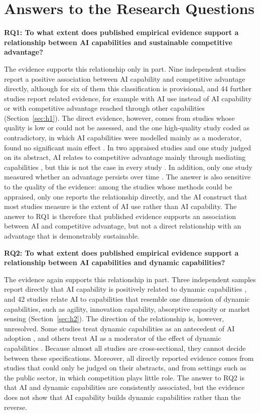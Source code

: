 \section{Answers to the Research Questions}
\label{sec:answers}

\textbf{RQ1: To what extent does published empirical evidence support a relationship between AI capabilities and sustainable competitive advantage?}

The evidence supports this relationship only in part. Nine independent studies report a positive association between AI capability and competitive advantage directly, although for six of them this classification is provisional, and 44 further studies report related evidence, for example with AI use instead of AI capability or with competitive advantage reached through other capabilities (Section~\ref{sec:h1}). The direct evidence, however, comes from studies whose quality is low or could not be assessed, and the one high-quality study coded as contradictory, in which AI capabilities were modelled mainly as a moderator, found no significant main effect \parencite{wang2026}. In two appraised studies and one study judged on its abstract, AI relates to competitive advantage mainly through mediating capabilities \parencite{srahin2026, texeira2026, chen2026}, but this is not the case in every study \parencite{guo2025}. In addition, only one study measured whether an advantage persists over time \parencite{dzreke2025}. The answer is also sensitive to the quality of the evidence: among the studies whose methods could be appraised, only one reports the relationship directly, and the AI construct that most studies measure is the extent of AI use rather than AI capability. The answer to RQ1 is therefore that published evidence supports an association between AI and competitive advantage, but not a direct relationship with an advantage that is demonstrably sustainable.

\textbf{RQ2: To what extent does published empirical evidence support a relationship between AI capabilities and dynamic capabilities?}

The evidence again supports this relationship in part. Three independent samples report directly that AI capability is positively related to dynamic capabilities \parencite{almheiri2025, fano2025, neirafernandez2026}, and 42 studies relate AI to capabilities that resemble one dimension of dynamic capabilities, such as agility, innovation capability, absorptive capacity or market sensing (Section~\ref{sec:h2}). The direction of the relationship is, however, unresolved. Some studies treat dynamic capabilities as an antecedent of AI adoption \parencite{deng2025}, and others treat AI as a moderator of the effect of dynamic capabilities \parencite{quoc2026}. Because almost all studies are cross-sectional, they cannot decide between these specifications. Moreover, all directly reported evidence comes from studies that could only be judged on their abstracts, and from settings such as the public sector, in which competition plays little role. The answer to RQ2 is that AI and dynamic capabilities are consistently associated, but the evidence does not show that AI capability builds dynamic capabilities rather than the reverse.


